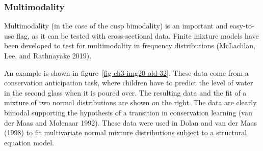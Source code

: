 \documentclass[
  a4paper,
  DIV=11,
  numbers=noendperiod,
  oneside]{scrreprt}
\newenvironment{Shaded}{}{}
\newcommand{\AttributeTok}[1]{\textcolor[rgb]{0.84,0.23,0.29}{#1}}
\newcommand{\CommentTok}[1]{\textcolor[rgb]{0.42,0.45,0.49}{#1}}
\newcommand{\DecValTok}[1]{\textcolor[rgb]{0.00,0.36,0.77}{#1}}
\newcommand{\FunctionTok}[1]{\textcolor[rgb]{0.44,0.26,0.76}{#1}}
\newcommand{\NormalTok}[1]{\textcolor[rgb]{0.14,0.16,0.18}{#1}}
\newcommand{\OtherTok}[1]{\textcolor[rgb]{0.44,0.26,0.76}{#1}}
\newcommand{\SpecialCharTok}[1]{\textcolor[rgb]{0.00,0.36,0.77}{#1}}
\newcommand{\StringTok}[1]{\textcolor[rgb]{0.01,0.18,0.38}{#1}}
\begin{document}
\begin{Shaded}
\end{Shaded}

\subsubsection{Multimodality}\label{sec-Multimodality}

Multimodality (in the case of the cusp bimodality) is an important and
easy-to-use flag, as it can be tested with cross-sectional data. Finite
mixture models have been developed to test for multimodality in
frequency distributions (McLachlan, Lee, and Rathnayake 2019).

An example is shown in figure~\ref{fig-ch3-img20-old-32}. These data
come from a conservation anticipation task, where children have to
predict the level of water in the second glass when it is poured over.
The resulting data and the fit of a mixture of two normal distributions
are shown on the right. The data are clearly bimodal supporting the
hypothesis of a transition in conservation learning (van der Maas and
Molenaar 1992). These data were used in Dolan and van der Maas (1998) to
fit multivariate normal mixture distributions subject to a structural
equation model.
\end{document}
